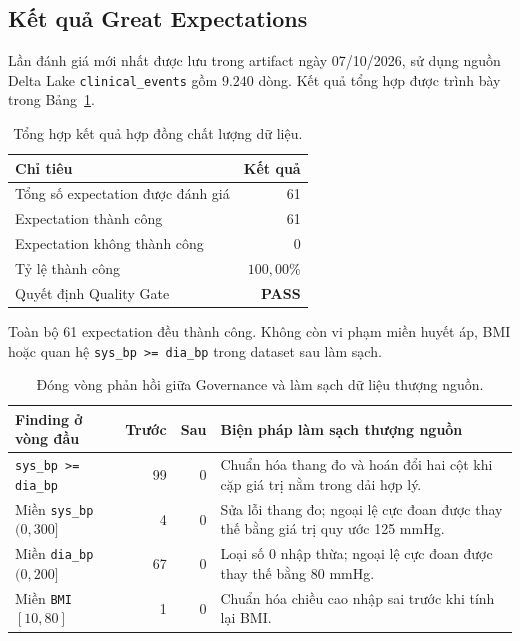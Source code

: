 \documentclass[11pt,a4paper]{article}
\begin{document}
\subsection{Kết quả Great Expectations}

Lần đánh giá mới nhất được lưu trong artifact ngày 07/10/2026, sử dụng nguồn Delta Lake \texttt{clinical\_events} gồm $9.240$ dòng. Kết quả tổng hợp được trình bày trong Bảng~\ref{tab:quality-summary}.

\begin{table}[ht]
\centering
\begin{tabular}{lr}
\toprule
\textbf{Chỉ tiêu} & \textbf{Kết quả} \\
\midrule
Tổng số expectation được đánh giá & 61 \\
Expectation thành công & 61 \\
Expectation không thành công & 0 \\
Tỷ lệ thành công & $100{,}00\%$ \\
Quyết định Quality Gate & \textbf{PASS} \\
\bottomrule
\end{tabular}
\caption{Tổng hợp kết quả hợp đồng chất lượng dữ liệu.}
\label{tab:quality-summary}
\end{table}

\begin{successbox}
Toàn bộ 61 expectation đều thành công. Không còn vi phạm miền huyết áp, BMI hoặc quan hệ \texttt{sys\_bp >= dia\_bp} trong dataset sau làm sạch.
\end{successbox}

\begin{table}[ht]
\centering
\small
\begin{tabularx}{\textwidth}{>{\raggedright\arraybackslash}X r r >{\raggedright\arraybackslash}X}
\toprule
\textbf{Finding ở vòng đầu} & \textbf{Trước} & \textbf{Sau} & \textbf{Biện pháp làm sạch thượng nguồn} \\
\midrule
\texttt{sys\_bp >= dia\_bp} & 99 & 0 & Chuẩn hóa thang đo và hoán đổi hai cột khi cặp giá trị nằm trong dải hợp lý. \\
Miền \texttt{sys\_bp} $(0,300]$ & 4 & 0 & Sửa lỗi thang đo; ngoại lệ cực đoan được thay thế bằng giá trị quy ước 125 mmHg. \\
Miền \texttt{dia\_bp} $(0,200]$ & 67 & 0 & Loại số 0 nhập thừa; ngoại lệ cực đoan được thay thế bằng 80 mmHg. \\
Miền \texttt{BMI} $[10,80]$ & 1 & 0 & Chuẩn hóa chiều cao nhập sai trước khi tính lại BMI. \\
\bottomrule
\end{tabularx}
\caption{Đóng vòng phản hồi giữa Governance và làm sạch dữ liệu thượng nguồn.}
\label{tab:quality-failures}
\end{table}
\end{document}
